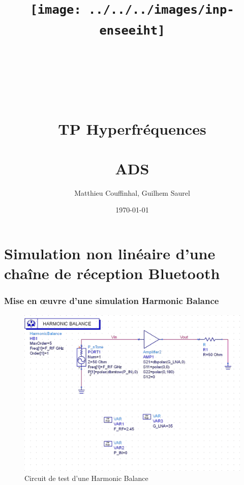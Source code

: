 \documentclass[10pt]{article}
\title{\texttt{[image: ../../../images/inp-enseeiht]} \\ ~ \\ ~ \\ ~ \\ ~ \\
TP Hyperfréquences \\ ~ \\ ADS}
\author{Matthieu Couffinhal, Guilhem Saurel}
\date{\today}
\begin{document}
\begin{titlepage}
    \maketitle
    \tableofcontents
\end{titlepage}

\part{Simulation non linéaire d’une chaîne de réception Bluetooth}
\section{Mise en œuvre d’une simulation Harmonic Balance}

\begin{figure}
    \begin{center}
        \includegraphics[width=15cm]{p5_circuit}
    \end{center}
    \caption{Circuit de test d’une Harmonic Balance}
\end{figure}
\end{document}
